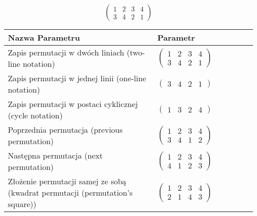 \documentclass[12pt]{article}
\begin{document}
\subsection{}
\begin{center}
\[
\begin{pmatrix}
	1 & 2 & 3 & 4 \\ 
	3 & 4 & 2 & 1 
\end{pmatrix}
\]

\begin{tabular}{|m{0.6\linewidth}|m{0.4\linewidth}|}
	\hline
	Nazwa Parametru & Parametr \\
	\hline
	Zapis permutacji w dwóch liniach (two-line notation) & $\begin{pmatrix} 1 & 2 & 3 & 4 \\ 
3 & 4 & 2 & 1 \end{pmatrix}$ \\ 
	\hline
	Zapis permutacji w jednej linii (one-line notation) & $\begin{pmatrix} 3 & 4 & 2 & 1 \end{pmatrix}$ \\ 
	\hline
	Zapis permutacji w postaci cyklicznej (cycle notation) & $\begin{pmatrix} 1 & 3 & 2 & 4 \end{pmatrix} $ \\ 
	\hline
	Poprzednia permutacja (previous permutation) & $\begin{pmatrix} 1 & 2 & 3 & 4 \\ 
3 & 4 & 1 & 2 \end{pmatrix}$ \\ 
	\hline
	Następna permutacja (next permutation) & $\begin{pmatrix} 1 & 2 & 3 & 4 \\ 
4 & 1 & 2 & 3 \end{pmatrix}$ \\ 
	\hline
	Złożenie permutacji samej ze sobą (kwadrat permutacji (permutation's square)) & $\begin{pmatrix} 1 & 2 & 3 & 4 \\ 
2 & 1 & 4 & 3 \end{pmatrix}$ \\ 
	\hline
\end{tabular}
\end{center}
\end{document}
